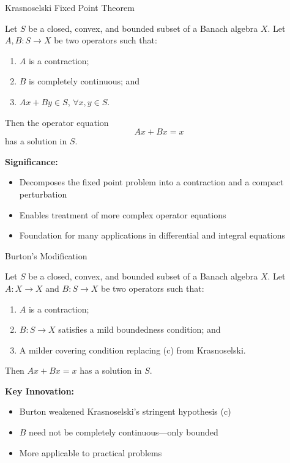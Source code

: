 \documentclass[aspectratio=169,10pt]{beamer}
\begin{document}
\begin{frame}[allowframebreaks]{Krasnoselski Fixed Point Theorem}
    \begin{theorem}
        Let $S$ be a closed, convex, and bounded subset of a Banach algebra $X$.
        Let $A, B: S \to X$ be two operators such that:
        \begin{enumerate}
            \item[(a)] $A$ is a contraction;
            \item[(b)] $B$ is completely continuous; and
            \item[(c)] $Ax + By \in S$, $\forall x, y \in S$.
        \end{enumerate}
        Then the operator equation
        \[
            Ax + Bx = x
        \]
        has a solution in $S$.
    \end{theorem}

    \textbf{Significance:}
    \begin{itemize}
        \item Decomposes the fixed point problem into a contraction and a compact perturbation
        \item Enables treatment of more complex operator equations
        \item Foundation for many applications in differential and integral equations
    \end{itemize}
\end{frame}

\begin{frame}{Burton's Modification}
    \begin{theorem}
        Let $S$ be a closed, convex, and bounded subset of a Banach algebra $X$.
        Let $A: X \to X$ and $B: S \to X$ be two operators such that:
        \begin{enumerate}
            \item[(a)] $A$ is a contraction;
            \item[(b)] [Weaker condition] $B: S \to X$ satisfies a mild boundedness condition; and
            \item[(c)] [Weaker covering] A milder covering condition replacing (c) from Krasnoselski.
        \end{enumerate}
        Then $Ax + Bx = x$ has a solution in $S$.
    \end{theorem}

    \textbf{Key Innovation:}
    \begin{itemize}
        \item Burton weakened Krasnoselski's stringent hypothesis (c)
        \item $B$ need not be completely continuous---only bounded
        \item More applicable to practical problems
    \end{itemize}
\end{frame}
\end{document}
